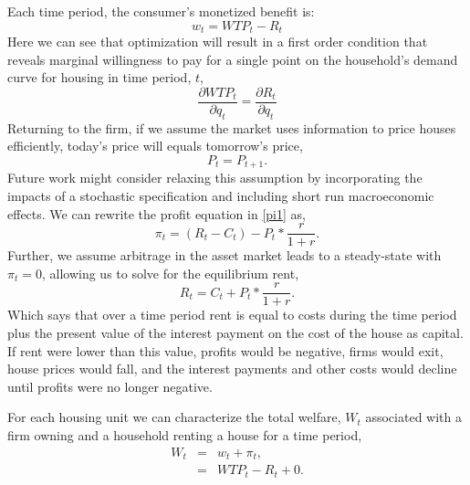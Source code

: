 \documentclass[ecta,nameyear,draft]{econsocart}
\theoremstyle{plain}
\theoremstyle{remark}
\begin{document}
Each time period, the consumer’s monetized benefit is:
\begin{equation*}
	 w_t=\mathit{WTP}_t-R_t
\end{equation*}
Here we can see that optimization will result in a first order condition that reveals marginal willingness
to pay for a single point on the household’s demand curve for housing in time period, $t$,
\begin{equation}
	\frac{\partial \mathit{WTP}_t}{\partial q_t}=\frac{\partial R_t}{\partial q_t} \label{foc}
\end{equation}
Returning to the firm, if we assume the market uses information to price houses efficiently, today’s price will equals tomorrow’s
price,
\begin{equation*}
	P_t=P_{t+1}.
\end{equation*}
Future work might consider relaxing this assumption by incorporating the impacts of a stochastic
specification and including short run macroeconomic effects.
We can rewrite the profit equation in \ref{pi1} as,
\begin{equation}
	\pi_t=(R_t-C_t)-P_t*\frac{r}{1+r}.\label{pi1.1}
\end{equation}
Further, we assume arbitrage in the asset market leads to a steady-state with $\pi_t=0$, allowing us to solve for the equilibrium rent,
\begin{equation*}
	R_t=C_t+P_t*\frac{r}{1+r}.
\end{equation*}
Which says that over a time period rent is equal to costs during the time period plus the present value of
the interest payment on the cost of the house as capital. If rent were lower than this value, profits
would be negative, firms would exit, house prices would fall, and the interest payments and other costs
would decline until profits were no longer negative.

For each housing unit we can characterize the total welfare, $W_t$ associated with a firm owning and a household renting a house for a time period,
\begin{eqnarray*}
	W_t & = & w_t+\pi_t,\\
	& = & \mathit{WTP}_t-R_t+0.
\end{eqnarray*}
\end{document}
